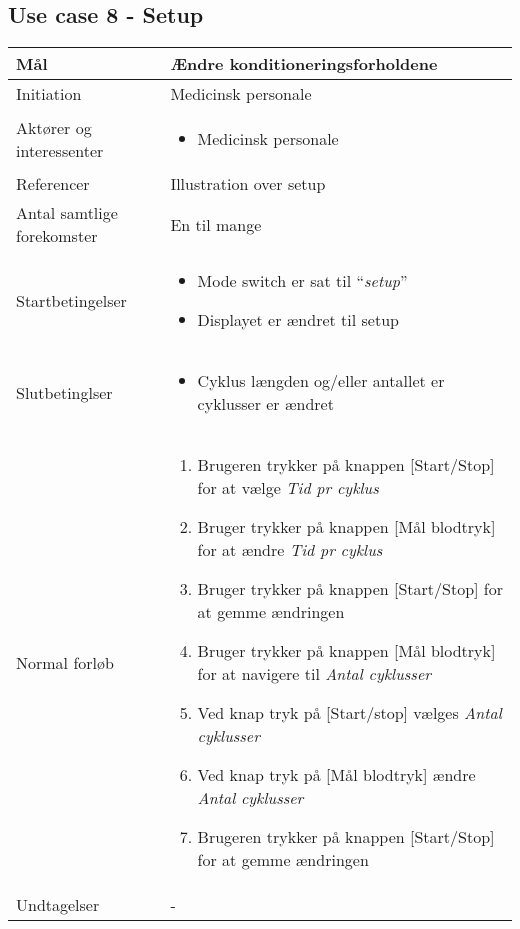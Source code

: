 	\subsection{Use case 8 - Setup}
		\begin{center}
			\begin{tabular}{ | p{} | p{}| } 
				\hline
				Mål & Ændre konditioneringsforholdene \\ 
				\hline
				Initiation &  Medicinsk personale\\
				\hline
				Aktører og interessenter & 
				\begin{itemize}
					\item Medicinsk personale 
				\end{itemize} \\ 
				\hline
				Referencer & Illustration over setup \\ 
				\hline
				Antal samtlige forekomster & En til mange \\ 
				\hline	
				Startbetingelser & 
				\begin{itemize}
					\item Mode switch er sat til “\textit{setup}” 
					\item Displayet er ændret til setup
 				\end{itemize} \\ 
				\hline
				Slutbetinglser & 
				\begin{itemize}
					\item Cyklus længden og/eller antallet er cyklusser er ændret
				\end{itemize} \\ 
				\hline
				Normal forløb & \begin{enumerate}
					\setlength\itemsep{0cm} %
					\item Brugeren trykker på knappen [Start/Stop] for at vælge \textit{Tid pr cyklus}
					\item Bruger trykker på knappen [Mål blodtryk] for at ændre \textit{Tid pr cyklus}
					\item Bruger trykker på knappen [Start/Stop] for at gemme ændringen
					\item Bruger trykker på knappen [Mål blodtryk] for at navigere til \textit{Antal cyklusser}
					\item Ved knap tryk på [Start/stop] vælges \textit{Antal cyklusser}
					\item Ved knap tryk på [Mål blodtryk] ændre \textit{Antal cyklusser}
					\item Brugeren trykker på knappen [Start/Stop] for at gemme ændringen
				\end{enumerate} \\ 
				\hline
				Undtagelser & -  \\ 
				\hline
			\end{tabular}
		\end{center}
			\pagebreak
